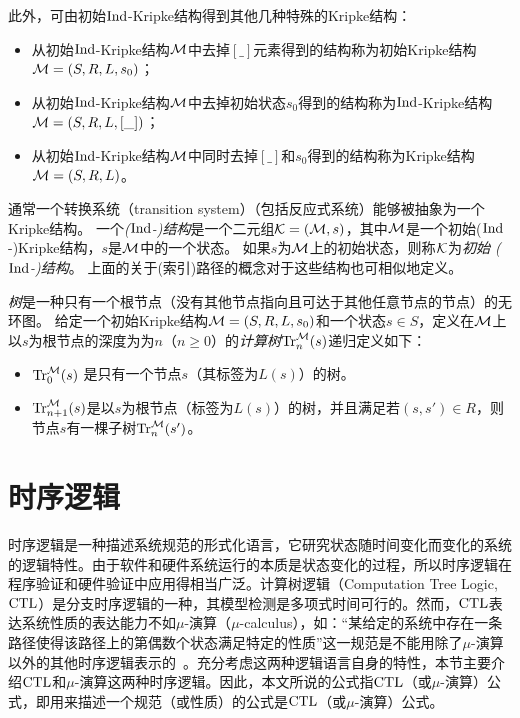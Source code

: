 此外，可由初始$\textrm{Ind}$-Kripke结构得到其他几种特殊的Kripke结构：
\begin{itemize}
	\item 从初始$\textrm{Ind}$-Kripke结构${\cal M}$中去掉$[\_]$元素得到的结构称为初始Kripke结构${\cal M}=(S,R,L,s_0)$；
	\item 从初始$\textrm{Ind}$-Kripke结构${\cal M}$中去掉初始状态$s_0$得到的结构称为$\textrm{Ind}$-Kripke结构${\cal M}=(S,R,L,[\_])$；
	\item 从初始$\textrm{Ind}$-Kripke结构${\cal M}$中同时去掉$[\_]$和$s_0$得到的结构称为Kripke结构${\cal M}=(S,R,L)$。
\end{itemize}
通常一个转换系统（transition system）（包括反应式系统）能够被抽象为一个Kripke结构\cite{Baier:PMC:2008}。
一个\emph{($\textrm{Ind}$-)结构}是一个二元组${\cal K}=({\cal M}, s)$，其中${\cal M}$是一个初始($\textrm{Ind}$-)Kripke结构，$s$是${\cal M}$中的一个状态。
如果$s$为${\cal M}$上的初始状态，则称${\cal K}$为{\em 初始 ($\textrm{Ind}$-)结构}。
上面的关于(索引)路径的概念对于这些结构也可相似地定义。
 
 






\emph{树}是一种只有一个根节点（没有其他节点指向且可达于其他任意节点的节点）的无环图。
给定一个初始Kripke结构${\cal M}=(S,R,L,s_0)$和一个状态$s\in S$，定义在${\cal M}$上以$s$为根节点的深度为为$n$（$n\ge 0$）的\emph{计算树}$\textrm{Tr}_n^{{\cal M}}(s)$递归定义如下\cite{browne1988characterizing}：
\begin{itemize}
	\item $\textrm{Tr}_0^{{\cal M}}(s)$ 是只有一个节点$s$（其标签为$L(s)$）的树。
	\item $\textrm{Tr}_{n+1}^{{\cal M}}(s)$是以$s$为根节点（标签为$L(s)$）的树，并且满足若$(s,s')\in R$，则节点$s$有一棵子树$\textrm{Tr}_{n}^{{\cal M}}(s')$。
\end{itemize}




\section{时序逻辑}
时序逻辑是一种描述系统规范的形式化语言，它研究状态随时间变化而变化的系统的逻辑特性。由于软件和硬件系统运行的本质是状态变化的过程，所以时序逻辑在程序验证和硬件验证中应用得相当广泛。计算树逻辑（Computation Tree Logic, $\textrm{CTL}$）是分支时序逻辑的一种，其模型检测是多项式时间可行的。然而，$\textrm{CTL}$表达系统性质的表达能力不如$\mu$-演算（$\mu$-calculus），如：“某给定的系统中存在一条路径使得该路径上的第偶数个状态满足特定的性质”这一规范是不能用除了$\mu$-演算以外的其他时序逻辑表示的~\cite{DBLP:series/txtcs/Schneider04}。充分考虑这两种逻辑语言自身的特性，本节主要介绍$\textrm{CTL}$和$\mu$-演算这两种时序逻辑。因此，本文所说的公式指$\textrm{CTL}$（或$\mu$-演算）公式，即用来描述一个规范（或性质）的公式是$\textrm{CTL}$（或$\mu$-演算）公式。

